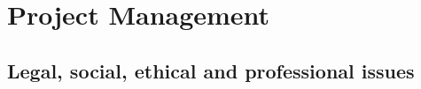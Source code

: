 \chapter{Project Management}
\label{ch:project-management}



\section{Legal, social, ethical and professional issues}
\label{sec:legal-social-ethical-professional-issues}

